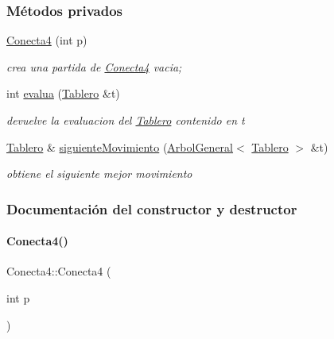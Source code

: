\subsubsection*{Métodos privados}
\begin{DoxyCompactItemize}
\item 
\hyperlink{classConecta4_a2bea867a7a92a7c9bd9e1a7f3fba7a9e}{Conecta4} (int p)
\begin{DoxyCompactList}\small\item\em crea una partida de \hyperlink{classConecta4}{Conecta4} vacia; \end{DoxyCompactList}\item 
int \hyperlink{classConecta4_acb02a160b22863c2f473b408328d9f7b}{evalua} (\hyperlink{classTablero}{Tablero} \&t)
\begin{DoxyCompactList}\small\item\em devuelve la evaluacion del \hyperlink{classTablero}{Tablero} contenido en t \end{DoxyCompactList}\item 
\hyperlink{classTablero}{Tablero} \& \hyperlink{classConecta4_ae9b5f7cbcb0dbaede77a49137d394c0f}{siguiente\+Movimiento} (\hyperlink{classArbolGeneral}{Arbol\+General}$<$ \hyperlink{classTablero}{Tablero} $>$ \&t)
\begin{DoxyCompactList}\small\item\em obtiene el siguiente mejor movimiento \end{DoxyCompactList}\end{DoxyCompactItemize}


\subsubsection{Documentación del constructor y destructor}
\hypertarget{classConecta4_a2bea867a7a92a7c9bd9e1a7f3fba7a9e}{}\label{classConecta4_a2bea867a7a92a7c9bd9e1a7f3fba7a9e} 
\paragraph{\texorpdfstring{Conecta4()}{Conecta4()}}
{\footnotesize\ttfamily Conecta4\+::\+Conecta4 (\begin{DoxyParamCaption}\item[{int}]{p }\end{DoxyParamCaption})\hspace{0.3cm}{\ttfamily [private]}}



